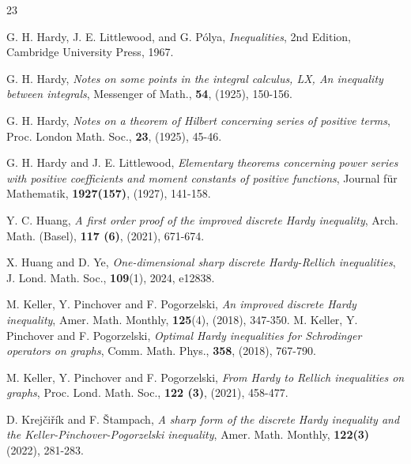 \documentclass[12pt]{amsart}
\theoremstyle{definition}
\theoremstyle{plain}
\theoremstyle{definition}
\numberwithin{equation}{section}
\begin{document}
\begin{thebibliography}{23}
%

         {\sc G. H. Hardy, J. E. Littlewood, and G. P\'{o}lya},
         {\it Inequalities},
         {2nd Edition, Cambridge University Press}, 1967.

         {\sc G. H. Hardy},
         {\it Notes on some points in the integral calculus, LX, An inequality between integrals},
         {Messenger of Math.}, {\bf54}, (1925), 150-156.

         {\sc G. H. Hardy},
         {\it Notes on a theorem of Hilbert concerning series of positive terms},
         {Proc. London Math. Soc.}, {\bf23}, (1925), 45-46.

         {\sc G. H. Hardy and J. E. Littlewood},
         {\it Elementary theorems concerning power series with positive coefficients and moment constants of positive functions},
         {Journal f\"{u}r Mathematik}, {\bf1927(157)}, (1927), 141-158.

         {\sc Y. C. Huang},
         {\it A first order proof of the improved discrete Hardy inequality},
         {Arch. Math. (Basel)}, {\bf117 (6)}, (2021), 671-674.

         {\sc X. Huang and D. Ye},
         {\it One-dimensional sharp discrete Hardy-Rellich inequalities},
         {J. Lond. Math. Soc.}, {\bf109}(1), 2024, e12838.

         {\sc M. Keller, Y. Pinchover and F. Pogorzelski},
         {\it An improved discrete Hardy inequality},
         {Amer. Math. Monthly}, {\bf125}(4), (2018), 347-350.
%
         {\sc M. Keller, Y. Pinchover and F. Pogorzelski},
         {\it Optimal Hardy inequalities for Schrodinger operators on graphs},
         {Comm. Math. Phys.}, {\bf358}, (2018), 767-790.

         {\sc M. Keller, Y. Pinchover and F. Pogorzelski},
         {\it From Hardy to Rellich inequalities on graphs},
         {Proc. Lond. Math. Soc.}, {\bf122 (3)}, (2021), 458-477.

         {\sc D. Krej\v{c}i\v{r}\'{i}k and F. \v{S}tampach},
         {\it A sharp form of the discrete Hardy inequality and the Keller-Pinchover-Pogorzelski inequality},
         {Amer. Math. Monthly}, {\bf122(3)} (2022), 281-283.


\end{thebibliography}
\end{document}
